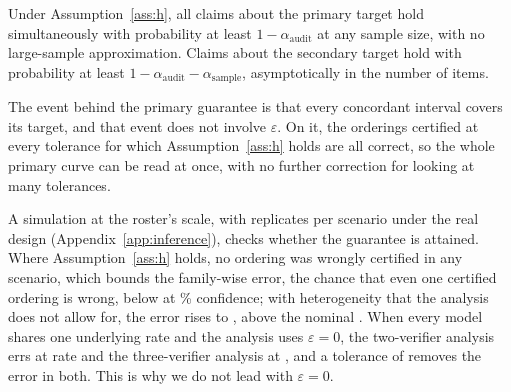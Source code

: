 \begin{proposition}[Coverage]
\label{prop:coverage}
Under Assumption~\ref{ass:h}, all claims about the primary target hold simultaneously with
probability at least $1 - \alpha_{\mathrm{audit}}$ at any sample size, with no large-sample
approximation. Claims about the
secondary target hold with probability at least $1 - \alpha_{\mathrm{audit}} -
\alpha_{\mathrm{sample}}$, asymptotically in the number of items.
\end{proposition}

The event behind the primary guarantee is that every concordant interval covers its target, and
that event does not involve $\varepsilon$. On it, the orderings certified at every tolerance for
which Assumption~\ref{ass:h} holds are all correct, so the whole primary curve can be read at once,
with no further correction for looking at many tolerances.

A simulation at the roster's scale, with \SimReplicates{} replicates per scenario under the real
design (Appendix~\ref{app:inference}), checks whether the guarantee is attained. Where
Assumption~\ref{ass:h} holds, no ordering was wrongly certified in any scenario, which bounds the
family-wise error, the chance that even one certified ordering is wrong, below \SimZeroFwerUpper{}
at \SimZeroFwerConfPct\% confidence; with heterogeneity
that the analysis does not allow for, the error rises to \SimFwerMisspecified{}, above the nominal
\AlphaAudit{}. When every model shares one underlying rate and the analysis uses $\varepsilon = 0$,
the two-verifier analysis errs at rate \SimFwerPropensityKTwo{} and the three-verifier analysis at
\SimFwerPropensityKThree{}, and a tolerance of \EpsPrereg{} removes the error in both. This is why we
do not lead with $\varepsilon = 0$.

